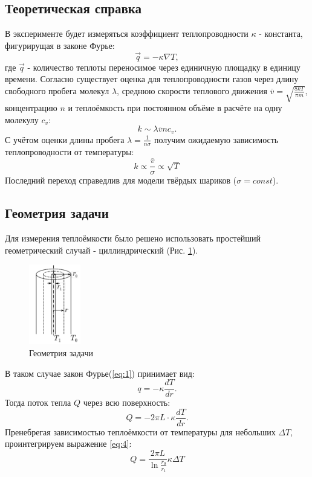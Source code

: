 \documentclass[12pt]{article}
\begin{document}
\subsection{Теоретическая справка}
В эксперименте будет измеряться коэффициент теплопроводности $\kappa$ - константа, фигурирущая в законе Фурье: 
\begin{equation}
    \vec{q} = -\kappa \nabla T, 
    \label{eq:1}
\end{equation} 
где $\vec{q}$ - количество теплоты переносимое через единичную площадку в единицу времени. 
Согласно \cite{Kirichenko} существует оценка для теплопроводности газов через длину свободного пробега молекул $\lambda$, 
среднюю скорости теплового движения $\overline{v} = \sqrt{\frac{8kT}{\pi m}}$, концентрацию $n$ и теплоёмкость при постоянном объёме в расчёте на одну молекулу $c_v$: 
\begin{equation}
    k \sim \lambda \overline{v} n c_v.
    \label{eq:2}
\end{equation}
С учётом оценки длины пробега $\lambda = \frac{1}{n\sigma}$ получим ожидаемую зависимость 
теплопроводности от температуры:
\begin{equation}
    k \propto \frac{\overline{v}}{\sigma} \propto \sqrt{T} 
\end{equation} 
Последний переход справедлив для модели твёрдых шариков ($\sigma = const$).
\subsection{Геометрия задачи}
Для измерения теплоёмкости было решено использовать простейший геометрический случай - циллиндрический (Рис. \ref{fig:1}).
\begin{figure}[H]
    \centering
    \includegraphics[width=0.2\textwidth]{1.png}
    \caption{Геометрия задачи}
    \label{fig:1}
\end{figure}
В таком случае закон Фурье(\ref{eq:1}) принимает вид:
\begin{equation}
    q = -\kappa \frac{dT}{dr}.
    \label{eq:3}
\end{equation}
Тогда поток тепла $Q$ через всю поверхность:
\begin{equation}
    Q = -2\pi L \cdot \kappa \frac{dT}{dr}.
    \label{eq:4}
\end{equation}
Пренебрегая зависимостью теплоёмкости от температуры для небольших $\Delta T$, проинтегрируем выражение \ref{eq:4}:
\begin{equation}
    Q = \frac{2\pi L}{\ln \frac{r_0}{r_1}} \kappa \Delta T
    \label{eq:QdT}
\end{equation}
\end{document}

